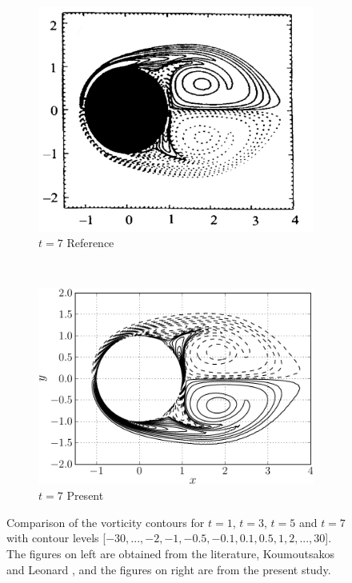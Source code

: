 \begin{figure}[p]
     \begin{subfigure}[t]{0.45\textwidth}
             \includegraphics[height=0.2\textheight]{figures/eulerian/ISC_vorticityContours_t7_ref-mod.png}
             \caption{$t=7$ Reference}
             \label{fig:ISC_vorticityContours_t7_ref}
     \end{subfigure}%
     ~ %
     \begin{subfigure}[t]{0.45\textwidth}
             \includegraphics[height=0.2\textheight]{figures/eulerian/ISC_vorticityContours_t7-crop.pdf}
             \caption{$t=7$ Present}
             \label{fig:ISC_vorticityContours_t7-crop}
     \end{subfigure}         

     \caption{Comparison of the vorticity contours for $t=1$, $t=3$, $t=5$ and $t=7$ with contour levels [$-30,...,-2,-1,-0.5,-0.1,0.1,0.5,1,2,...,30$]. The figures on left are obtained from the literature, Koumoutsakos and Leonard \cite{Koumoutsakos1995a}, and the figures on right are from the present study.}
     \label{fig:ISCS_vorticityContours_comparison}
	\end{figure}
	
